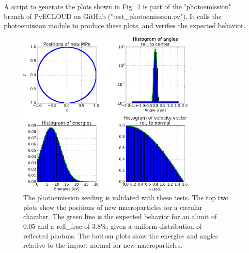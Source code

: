 A script to generate the plots shown in Fig.~\ref{fig:test_module} is part of the "photoemission" branch of PyECLOUD on GitHub ("test\_photoemission.py").
It calls the photoemission module to produce these plots, and verifies the expected behavior.
\begin{figure}[tbh]
    \centering
    \includegraphics[width=0.8\textwidth]{../plots/test_module.png}
    \caption{
        The photoemission seeding is validated with these tests.
        The top two plots show the positions of new macroparticles for a circular chamber.
        The green line is the expected behavior for an alimit of 0.05 and a refl\_frac of 3.8\%, given a uniform distribution of reflected photons.
        The bottom plots show the energies and angles relative to the impact normal for new macroparticles.
    }
    \label{fig:test_module}
\end{figure}


